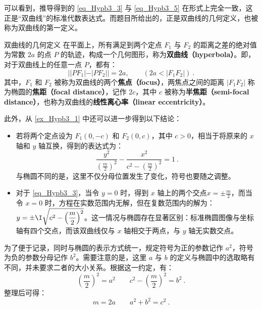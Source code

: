 可以看到，推导得到的 \autoref{eq_Hypb3_3} 与 \autoref{eq_Hypb3_5} 在形式上完全一致，这正是“双曲线”的标准代数表达式。而题目所给出的，正是双曲线的几何定义，也被称为双曲线的第一定义。

\begin{definition}{双曲线的几何定义}
在平面上，所有满足到两个定点 $F_1$ 与 $F_2$ 的距离之差的绝对值为常数 $2a$ 的点 $P$ 的轨迹，构成一个几何图形，称为\textbf{双曲线（hyperbola）}。即，对于双曲线上的任意一点 $P$，都有：
\begin{equation}
||PF_1| - |PF_2|| = 2a ,\qquad(2a<|F_1F_2|)~.
\end{equation}
其中，$F_1$ 和 $F_2$ 被称为双曲线的两个\textbf{焦点（focus）}，两焦点之间的距离 $|F_1F_2|$ 称为椭圆的\textbf{焦距（focal distance）}，记作 $2c$，其中 $c$ 被称为\textbf{半焦距（semi-focal distance）}，也称为双曲线的\textbf{线性离心率（linear eccentricity）}。
\end{definition}

此外，从 \autoref{ex_Hypb3_1} 中还可以进一步得到以下结论：

\begin{itemize}
\item 若将两个定点设为 $F_1(0,-c)$ 和 $F_2(0,c)$，其中 $c > 0$，相当于将原来的 $x$ 轴和 $y$ 轴互换，得到的表达式为：
\begin{equation}\label{eq_Hypb3_7}
\frac{y^2}{\left(\displaystyle\frac{m}{2}\right)^2}-\frac{x^2}{\displaystyle c^2-\left(\frac{m}{2}\right)^2} =1~.
\end{equation}
与椭圆不同的是，这里不仅分母位置发生了变化，符号也要随之调整。
\item 对于 \autoref{eq_Hypb3_3}，当令 $y = 0$ 时，得到 $x$ 轴上的两个交点$\displaystyle x = \pm \frac{m}{2}$，而当令 $x = 0$ 时，方程在实数范围内无解，但在复数范围内的解为：$y = \displaystyle\pm \I \sqrt{c^2 - \left( \frac{m}{2} \right)^2}$。这一情况与椭圆存在显著区别：标准椭圆图像与坐标轴有四个交点，而该双曲线仅与 $x$ 轴相交于两点，与 $y$ 轴无实数交点。
\end{itemize}

为了便于记录，同时与椭圆的表示方式统一，规定符号为正的参数记作 $a^2$，符号为负的参数分母记作 $b^2$。需要注意的是，这里 $a$ 与 $b$ 的定义与椭圆中的选取略有不同，并未要求二者的大小关系。根据这一约定，有：
\begin{equation}
\left(\displaystyle\frac{m}{2}\right)^2=a^2\qquad c^2-\displaystyle\left(\frac{m}{2}\right)^2=b^2~.
\end{equation}
整理后可得：
\begin{equation}
m=2a\qquad a^2+b^2=c^2~.
\end{equation}


